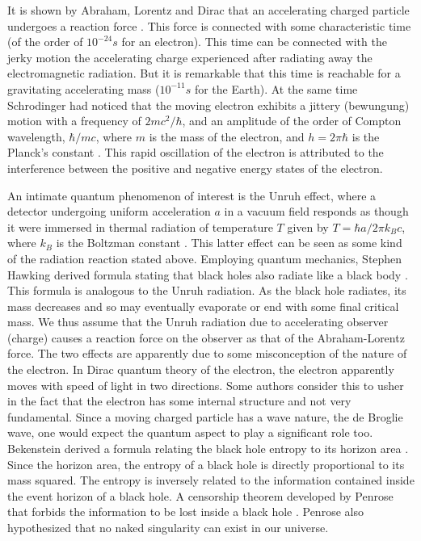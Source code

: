 \documentclass[12pt]{article}
\begin{document}
It is shown by Abraham, Lorentz and Dirac that an accelerating charged particle undergoes a reaction force {\cite{abraham, lorentz, dirac}}. This force is connected with some characteristic time (of the order of $10^{-24}s$ for an electron). This time can be connected with the jerky  motion the accelerating charge experienced after radiating away the electromagnetic radiation. But it is remarkable that this time is reachable for a gravitating accelerating mass ($10^{-11}s$ for the Earth). At the same time Schrodinger had noticed that the moving electron exhibits a jittery (bewungung) motion with a frequency of $2mc^2/\hbar$, and an amplitude of the order of Compton wavelength, $\hbar/mc$, where $m$ is the mass of the electron, and $h=2\pi\hbar$ is the Planck's constant {\cite{schrod}}. This rapid oscillation of the electron is attributed to the interference between the positive and negative energy states of the electron.


An intimate quantum phenomenon of interest is the Unruh effect, where a detector undergoing uniform acceleration $a$ in a vacuum field responds as though it were
immersed in thermal radiation of temperature $T$ given by $T=\hbar a/2\pi k_Bc$, where $k_B$ is the Boltzman constant {\cite{unruh}}. This latter effect can be seen as  some kind of the radiation reaction stated above.  Employing quantum mechanics,  Stephen Hawking derived formula stating that black holes also radiate like a black body {\cite{hawking}}.  This formula is analogous to the Unruh radiation. As the black hole radiates, its mass decreases and so may eventually evaporate or end with some final critical mass. We thus assume that the Unruh radiation due to accelerating observer (charge) causes a reaction force on the observer as that of the Abraham-Lorentz force. The two effects are apparently due to some misconception of the nature of the electron.  In Dirac quantum theory of the electron, the electron apparently moves with speed of light in two directions. Some authors consider this to usher in the fact that the electron has some internal structure and not very fundamental. Since a moving charged particle has a wave nature, the de Broglie wave, one would expect the quantum aspect to play a significant role too. Bekenstein derived a formula relating the black hole entropy to its horizon area {\cite{entropy}}. Since the horizon area, the entropy of a black hole is directly proportional to its mass squared. The entropy is  inversely related to the information contained inside the event horizon of a black hole. A censorship theorem developed by Penrose that forbids the information to be lost inside a black hole {\cite{censor}}. Penrose also hypothesized that no naked singularity can exist in our universe.
\end{document}
